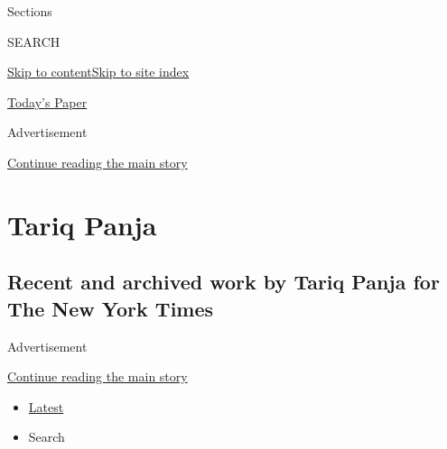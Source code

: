 Sections

SEARCH

\protect\hyperlink{site-content}{Skip to
content}\protect\hyperlink{site-index}{Skip to site index}

\href{https://myaccount.nytimes3xbfgragh.onion/auth/login?response_type=cookie\&client_id=vi}{}

\href{https://www.nytimes3xbfgragh.onion/section/todayspaper}{Today's
Paper}

Advertisement

\protect\hyperlink{after-top}{Continue reading the main story}

\hypertarget{tariq-panja}{%
\section{Tariq Panja}\label{tariq-panja}}

\hypertarget{recent-and-archived-work-by-tariq-panja-for-the-new-york-times}{%
\subsection{Recent and archived work by Tariq Panja for The New York
Times}\label{recent-and-archived-work-by-tariq-panja-for-the-new-york-times}}

Advertisement

\protect\hyperlink{after-mid1}{Continue reading the main story}

\begin{itemize}
\tightlist
\item
  \protect\hyperlink{stream-panel}{Latest}
\item
  Search
\end{itemize}

